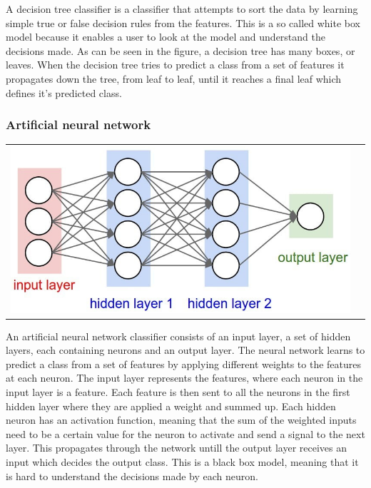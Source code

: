 \documentclass[12pt]{article}
\begin{document}
A decision tree classifier is a classifier that attempts to sort the data by learning simple true or false decision rules from the features. This is a so called white box model because it enables a user to look at the model and understand the decisions made. As can be seen in the figure, a decision tree has many boxes, or leaves. When the decision tree tries to predict a class from a set of features it propagates down the tree, from leaf to leaf, until it reaches a final leaf which defines it’s predicted class.

\subsubsection{Artificial neural network}

\begin{center}
\begin{tabular}{cc}
\includegraphics[scale = 0.2]{NN.jpg}
\end{tabular}
\end{center}
An artificial neural network classifier consists of an input layer, a set of hidden layers, each containing neurons and an output layer. The neural network learns to predict a class from a set of features by applying different weights to the features at each neuron. The input layer represents the features, where each neuron in the input layer is a feature. Each feature is then sent to all the neurons in the first hidden layer where they are applied a weight and summed up. Each hidden neuron has an activation function, meaning that the sum of the weighted inputs need to be a certain value for the neuron to activate and send a signal to the next layer. This propagates through the network untill the output layer receives an input which decides the output class. This is a black box model, meaning that it is hard to understand the decisions made by each neuron.
\end{document}
